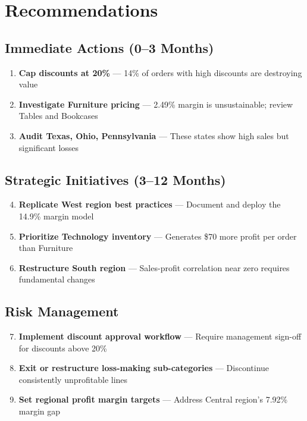 \documentclass[11pt,a4paper]{article}
\begin{document}
\section{Recommendations}

\subsection{Immediate Actions (0--3 Months)}

\begin{enumerate}[label=\color{warningred}\textbf{\theenumi.}, leftmargin=*]
    \item \textbf{Cap discounts at 20\%} — 14\% of orders with high discounts are destroying value
    \item \textbf{Investigate Furniture pricing} — 2.49\% margin is unsustainable; review Tables and Bookcases
    \item \textbf{Audit Texas, Ohio, Pennsylvania} — These states show high sales but significant losses
\end{enumerate}

\subsection{Strategic Initiatives (3--12 Months)}

\begin{enumerate}[label=\color{accent}\textbf{\theenumi.}, leftmargin=*]
    \setcounter{enumi}{3}
    \item \textbf{Replicate West region best practices} — Document and deploy the 14.9\% margin model
    \item \textbf{Prioritize Technology inventory} — Generates \$70 more profit per order than Furniture
    \item \textbf{Restructure South region} — Sales-profit correlation near zero requires fundamental changes
\end{enumerate}

\subsection{Risk Management}

\begin{enumerate}[label=\color{gold}\textbf{\theenumi.}, leftmargin=*]
    \setcounter{enumi}{6}
    \item \textbf{Implement discount approval workflow} — Require management sign-off for discounts above 20\%
    \item \textbf{Exit or restructure loss-making sub-categories} — Discontinue consistently unprofitable lines
    \item \textbf{Set regional profit margin targets} — Address Central region's 7.92\% margin gap
\end{enumerate}
\end{document}
